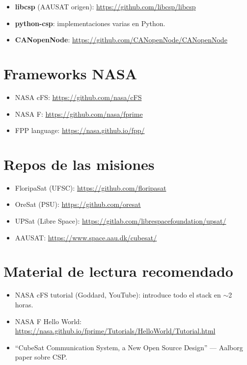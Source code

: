 \documentclass[11pt,a4paper,oneside,openright]{book}
\begin{document}
\begin{itemize}[leftmargin=2em]
  \item \textbf{libcsp} (AAUSAT origen): \url{https://github.com/libcsp/libcsp}
  \item \textbf{python-csp}: implementaciones varias en Python.
  \item \textbf{CANopenNode}: \url{https://github.com/CANopenNode/CANopenNode}
\end{itemize}

\section{Frameworks NASA}

\begin{itemize}[leftmargin=2em]
  \item NASA cFS: \url{https://github.com/nasa/cFS}
  \item NASA F\textquotesingle{}: \url{https://github.com/nasa/fprime}
  \item FPP language: \url{https://nasa.github.io/fpp/}
\end{itemize}

\section{Repos de las misiones}

\begin{itemize}[leftmargin=2em]
  \item FloripaSat (UFSC): \url{https://github.com/floripasat}
  \item OreSat (PSU): \url{https://github.com/oresat}
  \item UPSat (Libre Space): \url{https://gitlab.com/librespacefoundation/upsat/}
  \item AAUSAT: \url{https://www.space.aau.dk/cubesat/}
\end{itemize}

\section{Material de lectura recomendado}

\begin{itemize}[leftmargin=2em]
  \item NASA cFS tutorial (Goddard, YouTube): introduce todo el stack
    en $\sim$2 horas.
  \item NASA F\textquotesingle{} Hello World: \url{https://nasa.github.io/fprime/Tutorials/HelloWorld/Tutorial.html}
  \item ``CubeSat Communication System, a New Open Source Design''
    --- Aalborg paper sobre CSP.
\end{itemize}
\end{document}

